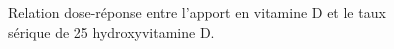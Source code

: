 \documentclass[
  a4paper,
  DIV=11,
  numbers=noendperiod,
  listof=totoc]{scrreprt}
\begin{document}
\begin{figure}

\begin{minipage}[t]{0.50\linewidth}

{\centering 


\caption{\label{fig-vd-pk-estim}Relation dose-réponse entre l'apport en
vitamine D et le taux sérique de 25 hydroxyvitamine D.
\textcite{Veugelers.2014}}

}

\end{minipage}%
%
\begin{minipage}[t]{0.50\linewidth}

{\centering 

}
\end{minipage}
\end{figure}
\end{document}
